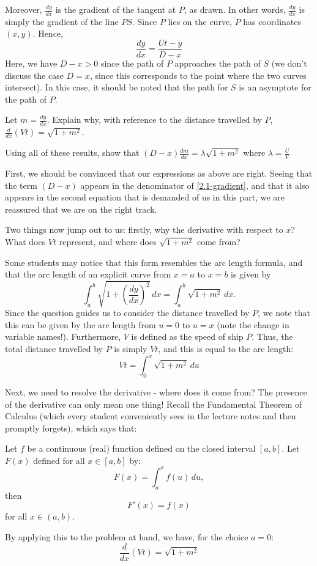 \documentclass[../jarvis.tex]{subfiles}
\begin{document}
Moreover, $\frac{dy}{dx}$ is the gradient of the tangent at $P$, as drawn. In other words, $\frac{dy}{dx}$ is simply the gradient of the line $PS$. Since $P$ lies on the curve, $P$ has coordinates $(x, y)$. Hence,
\begin{equation} \label{2.1-gradient}
    \frac{dy}{dx}=\frac{Ut-y}{D-x}
\end{equation}
Here, we have $D-x > 0$ since the path of $P$ approaches the path of $S$ (we don't discuss the case $D=x$, since this corresponds to the point where the two curves intersect). In this case, it should be noted that the path for $S$ is an asymptote for the path of $P$.  
\begin{example}[cont.]\label{pursuit-curve:results}
Let $m=\frac{dy}{dx}$. Explain why, with reference to the distance travelled by $P$, $\frac{d}{dx}(Vt)=\sqrt{1+m^2}$.

Using all of these results, show that $(D-x)\frac{dm}{dx}=\lambda\sqrt{1+m^2}$ where $\lambda=\frac{U}{V}$
\end{example}
First, we should be convinced that our expressions as above are right. Seeing that the term $(D-x)$ appears in the denominator of \eqref{2.1-gradient}, and that it also appears in the second equation that is demanded of us in this part, we are reassured that we are on the right track.

Two things now jump out to us: firstly, why the derivative with respect to $x$? What does $Vt$ represent, and where does $\sqrt{1+m^2}$ come from?

Some students may notice that this form resembles the arc length formula, and that the arc length of an explicit curve from $x=a$ to $x=b$ is given by
$$\int_{a}^{b}\sqrt{1+\left(\frac{dy}{dx}\right)^2} \,dx =\int_{a}^{b}\sqrt{1+m^2} \,dx .$$
Since the question guides us to consider the distance travelled by $P$, we note that this can be given by the arc length from $u=0$ to $u=x$ (note the change in variable names!). Furthermore, $V$ is defined as the speed of ship $P$. Thus, the total distance travelled by $P$ is simply $Vt$, and this is equal to the arc length:
$$Vt=\int_{0}^{x}\sqrt{1+m^2} \,du$$

Next, we need to resolve the derivative - where does it come from? The presence of the derivative can only mean one thing! Recall the Fundamental Theorem of Calculus (which every student conveniently sees in the lecture notes and then promptly forgets), which says that: 
\begin{theorem}
Let $f$ be a continuous (real) function defined on the closed interval $[a,b]$. Let $F(x)$ defined for all $x\in[a,b]$ by:
$$F(x)=\int_a^x f(u)\,du,$$ then $$F'(x)=f(x)$$ for all $x \in (a, b)$. 
\end{theorem}
By applying this to the problem at hand, we have, for the choice $a=0$:
\begin{equation}\label{2.1-distance}
    \frac{d}{dx}(Vt)=\sqrt{1+m^2}
\end{equation}
\end{document}
